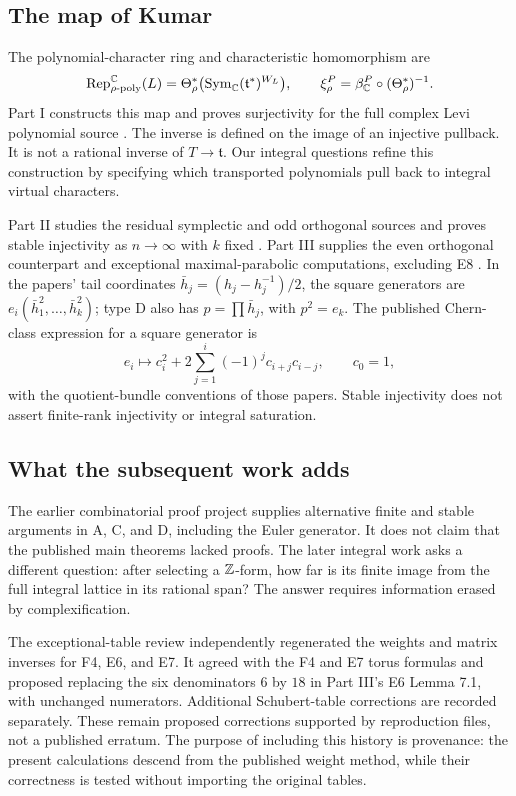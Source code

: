 \subsection{The map of Kumar}
The polynomial-character ring and characteristic homomorphism are
\[
 \operatorname{Rep}_{\rho\text{-poly}}^\mathbb C(L)
 =\Theta_\rho^*\bigl(\operatorname{Sym}_\mathbb C(\mathfrak t^*)^{W_L}\bigr),\qquad
 \xi_\rho^P=\beta_\mathbb C^P\circ(\Theta_\rho^*)^{-1}.
\]
Part I constructs this map and proves surjectivity for the full complex Levi polynomial source \cite{Kumar}. The inverse is defined on the image of an injective pullback. It is not a rational inverse of $T\to\mathfrak t$. Our integral questions refine this construction by specifying which transported polynomials pull back to integral virtual characters.

Part II studies the residual symplectic and odd orthogonal sources and proves stable injectivity as $n\to\infty$ with $k$ fixed \cite{KR}. Part III supplies the even orthogonal counterpart and exceptional maximal-parabolic computations, excluding E8 \cite{KX}. In the papers' tail coordinates $\bar h_j=(h_j-h_j^{-1})/2$, the square generators are $e_i(\bar h_1^2,\ldots,\bar h_k^2)$; type D also has $p=\prod\bar h_j$, with $p^2=e_k$. The published Chern-class expression for a square generator is
\[
 e_i\longmapsto c_i^2+2\sum_{j=1}^i(-1)^j c_{i+j}c_{i-j},
 \qquad c_0=1,
\]
with the quotient-bundle conventions of those papers. Stable injectivity does not assert finite-rank injectivity or integral saturation.

\subsection{What the subsequent work adds}
The earlier combinatorial proof project supplies alternative finite and stable arguments in A, C, and D, including the Euler generator. It does not claim that the published main theorems lacked proofs. The later integral work asks a different question: after selecting a $\mathbb Z$-form, how far is its finite image from the full integral lattice in its rational span? The answer requires information erased by complexification.

The exceptional-table review independently regenerated the weights and matrix inverses for F4, E6, and E7. It agreed with the F4 and E7 torus formulas and proposed replacing the six denominators $6$ by $18$ in Part III's E6 Lemma 7.1, with unchanged numerators. Additional Schubert-table corrections are recorded separately. These remain proposed corrections supported by reproduction files, not a published erratum. The purpose of including this history is provenance: the present calculations descend from the published weight method, while their correctness is tested without importing the original tables.

